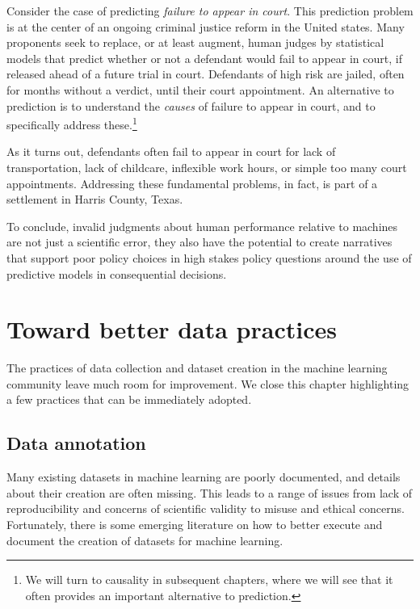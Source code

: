 \documentclass{tufte-book}
\begin{document}
Consider the case of predicting \emph{failure to appear in court}. This
prediction problem is at the center of an ongoing criminal justice
reform in the United states. Many proponents seek to replace, or at
least augment, human judges by statistical models that predict whether
or not a defendant would fail to appear in court, if released ahead of a
future trial in court. Defendants of high risk are jailed, often for
months without a verdict, until their court appointment. An alternative
to prediction is to understand the \emph{causes} of failure to appear in
court, and to specifically address these.\footnote{We will turn to
  causality in subsequent chapters, where we will see that it often
  provides an important alternative to prediction.}

As it turns out, defendants often fail to appear in court for lack of
transportation, lack of childcare, inflexible work hours, or simple too
many court appointments. Addressing these fundamental problems, in fact,
is part of a settlement in Harris County, Texas.

To conclude, invalid judgments about human performance relative to
machines are not just a scientific error, they also have the potential
to create narratives that support poor policy choices in high stakes
policy questions around the use of predictive models in consequential
decisions.

\hypertarget{toward-better-data-practices}{%
\section{Toward better data
practices}\label{toward-better-data-practices}}

The practices of data collection and dataset creation in the machine
learning community leave much room for improvement. We close this
chapter highlighting a few practices that can be immediately adopted.

\hypertarget{data-annotation}{%
\subsection{Data annotation}\label{data-annotation}}

Many existing datasets in machine learning are poorly documented, and
details about their creation are often missing. This leads to a range of
issues from lack of reproducibility and concerns of scientific validity
to misuse and ethical concerns. Fortunately, there is some emerging
literature on how to better execute and document the creation of
datasets for machine learning.
\end{document}
